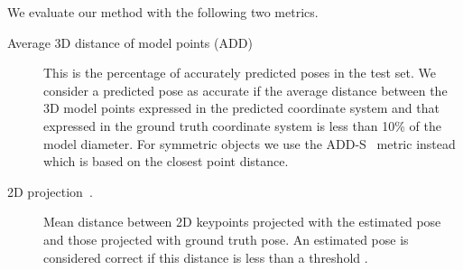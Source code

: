 \documentclass[10pt,twocolumn,letterpaper]{article}
\begin{document}
We evaluate our method with the following two metrics. 
\begin{description}
    \item[Average 3D distance of model points (ADD)~\cite{Hinterstoisser2012model}] This is the percentage of accurately predicted poses in the test set. We consider a predicted pose as accurate if the average distance between the 3D model points expressed in the predicted coordinate system and that expressed in the ground truth coordinate system is less than 10\% of the model diameter. For symmetric objects we use the  ADD-S~\cite{Xiang2018posecnn} metric instead which is based on the closest point distance.
    
    


    \item [2D projection~\cite{Brachmann2016Uncertainty}.] Mean distance between 2D keypoints projected with the estimated pose and those projected with ground truth pose. An estimated pose is considered correct if this distance is less than a threshold . 
\end{description}
\end{document}
